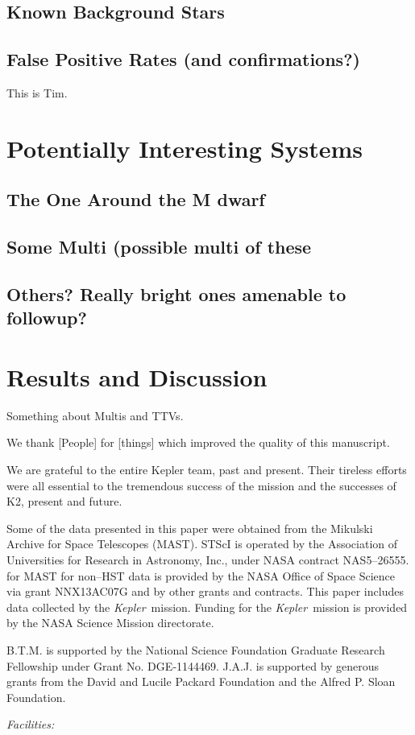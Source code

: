 \documentclass{emulateapj}
\newcommand{\project}[1]{\textsl{#1}}
\newcommand{\kep}{\project{Kepler}}
\newcommand{\todo}[3]{{\color{#2} \emph{#1} TO DO: #3}}
\newcommand{\btmtodo}[1]{\todo{BEN}{red}{#1}}
\begin{document}
\subsection{Known Background Stars}

\subsection{False Positive Rates (and confirmations?)}
This is Tim.

\section{Potentially Interesting Systems}
\subsection{The One Around the M dwarf}

\subsection{Some Multi (possible multi of these}

\subsection{Others? Really bright ones amenable to followup?}

\section{Results and Discussion}

Something about Multis and TTVs. 




\acknowledgements
We thank [People] for [things] which improved the quality of this manuscript.


We are grateful to the entire Kepler team, past and present. 
Their tireless efforts were all essential to the tremendous success of the mission and the successes of K2, present and future.


Some of the data presented in this paper were obtained from the Mikulski
Archive for Space Telescopes (MAST). 
STScI is operated by the Association of Universities for Research 
in Astronomy, Inc., under NASA contract NAS5--26555. 
for MAST for non--HST data is provided by the NASA Office of Space 
Science via grant NNX13AC07G and by other grants and contracts. 
This paper includes data collected by the \kep\ mission. 
Funding for the \kep\ mission is provided by the NASA Science 
Mission directorate.

B.T.M. is supported by the National Science Foundation Graduate Research
Fellowship under Grant No. DGE‐1144469. 
J.A.J. is supported by generous grants from the David and Lucile Packard
Foundation and the Alfred P. Sloan Foundation.



{\it Facilities:} %




\end{document}
